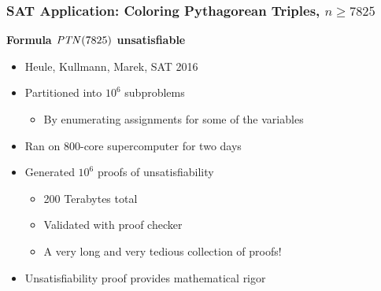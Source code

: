 \documentclass[t,pdf]{beamer}
\begin{document}
\begin{frame}
\frametitle{SAT Application: Coloring Pythagorean Triples, $n\geq 7825$}

{\bf Formula ${\it PTN}(7825)$ unsatisfiable}
\begin{itemize}
\item Heule, Kullmann, Marek, SAT 2016

\medskip

\item Partitioned into $10^6$ subproblems
  \begin{itemize}
    \item By enumerating assignments for some of the variables
  \end{itemize}

\medskip

  
\item Ran on 800-core supercomputer for two days

\medskip

\item Generated $10^6$ proofs of unsatisfiability
  \begin{itemize}
  \item 200 Terabytes total
  \item Validated with proof checker
  \item A very long and very tedious collection of proofs!
  \end{itemize}

\item Unsatisfiability proof provides mathematical rigor
\end{itemize}

\end{frame}
\end{document}
